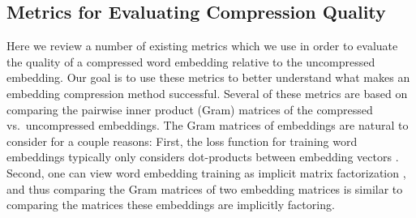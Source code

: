 



\subsection{Metrics for Evaluating Compression Quality}
\label{subsec:existing_metrics}
Here we review a number of existing metrics which we use in order to evaluate the quality of a compressed word embedding relative to the uncompressed embedding.
Our goal is to use these metrics to better understand what makes an embedding compression method successful.
Several of these metrics are based on comparing the pairwise inner product (Gram) matrices of the compressed vs.\ uncompressed embeddings.
The Gram matrices of embeddings are natural to consider for a couple reasons:
First, the loss function for training word embeddings typically only considers dot-products between embedding vectors \citep{word2vec13,glove14}.
Second, one can view word embedding training as implicit matrix factorization \citep{levy2014neural}, and thus comparing the Gram matrices of two embedding matrices is similar to comparing the matrices these embeddings are implicitly factoring.

